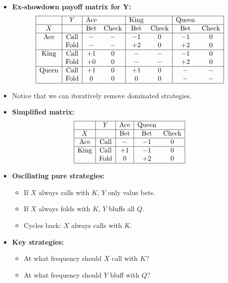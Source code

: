 \documentclass[12pt]{article}
\begin{document}
\begin{itemize}
    \item \textbf{Ex-showdown payoff matrix for Y:}
    \[
    \begin{array}{|c|c|cc|cc|cc|}
    \hline
    & Y & \text{Ace} &  & \text{King} &  & \text{Queen} & \\
    \hline
    X & & \text{Bet} & \text{Check} & \text{Bet} & \text{Check} & \text{Bet} & \text{Check} \\
    \hline
    \text{Ace} & \text{Call} & - & - & -1 & 0 & -1 & 0 \\
    & \text{Fold} & - & - & +2 & 0 & +2 & 0 \\
    \hline
    \text{King} & \text{Call} & +1 & 0 & - & - & -1 & 0 \\
    & \text{Fold} & +0 & 0 & - & - & +2 & 0 \\
    \hline
    \text{Queen} & \text{Call} & +1 & 0 & +1 & 0 & - & - \\
    & \text{Fold} & 0 & 0 & 0 & 0 & - & - \\
    \hline
    \end{array}
    \]

    \item Notice that we can iteratively remove dominated strategies.
    
    \item \textbf{Simplified matrix:}
    \[
    \begin{array}{|c|c|c|cc|}
    \hline
         & Y & \text{Ace} & \text{Queen} &\\
    \hline
       X  & & \text{Bet} & \text{Bet} & \text{Check} \\
    \hline
       \text{Ace} & \text{Call} & - & -1 & 0 \\
    \hline
        \text{King} & \text{Call} & +1 & -1 & 0 \\
        & \text{Fold} & 0 & +2 & 0 \\
    \hline
    \end{array}
    \]

    \item \textbf{Oscillating pure strategies:}
    \begin{itemize}
        \item If $X$ always calls with $K$, $Y$ only value bets.
        \item If $X$ always folds with $K$, $Y$ bluffs all $Q$.
        \item Cycles back: $X$ always calls with $K$.
    \end{itemize}

    \item \textbf{Key strategies:}
    \begin{itemize}
        \item At what frequency should $X$ call with $K$?
        \item At what frequency should $Y$ bluff with $Q$?
    \end{itemize}
\end{itemize}
\end{document}
